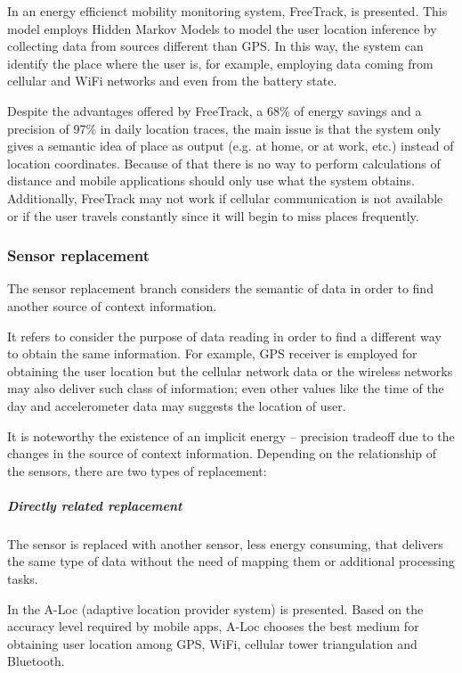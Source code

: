 In \cite{Chon2014} an energy efficienct mobility monitoring system, FreeTrack, is presented.
This model employs Hidden Markov Models to model the user location inference by collecting data from sources different than GPS.
In this way, the system can identify the place where the user is, for example, employing data coming from cellular and WiFi networks and even from the battery state.

Despite the advantages offered by FreeTrack, a 68\% of energy savings and a precision of 97\% in daily location traces, the main issue is that the system only gives a semantic idea of place as output (e.g. at home, or at work, etc.) instead of location coordinates. 
Because of that there is no way to perform calculations of distance and mobile applications should only use what the system obtains. 
Additionally, FreeTrack may not work if cellular communication is not available or if the user travels constantly since it will begin to miss places frequently.


\subsubsection{Sensor replacement}
\label{ssub:sensor_replacement}

The sensor replacement branch considers the semantic of data in order to find another source of context information.

It refers to consider the purpose of data reading in order to find a different way to obtain the same information. For example, GPS receiver is employed for obtaining the user location but the cellular network data or the wireless networks may also deliver such class of information; even other values like the time of the day and accelerometer data may suggests the location of user.

It is noteworthy the existence of an implicit energy – precision tradeoff due to the changes in the source of context information.
Depending on the relationship of the sensors, there are two types of replacement:

\subparagraph{Directly related replacement}
\label{subp:directly_related_replacement}
The sensor is replaced with another sensor, less energy consuming, that delivers the same type of data without the need of mapping them or additional processing tasks.

In \cite{Lin2010} the A-Loc (adaptive location provider system) is presented.
Based on the accuracy level required by mobile apps, A-Loc chooses the best medium for obtaining user location among GPS, WiFi, cellular tower triangulation and Bluetooth.

